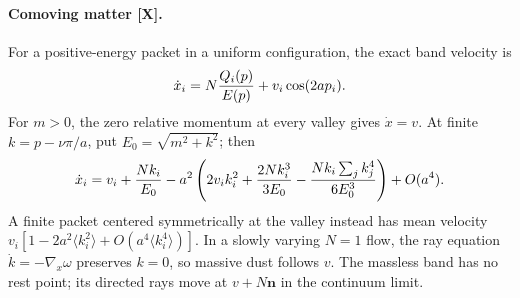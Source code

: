 
\paragraph{Comoving matter [X].}
For a positive-energy packet in a uniform configuration, the exact band
velocity is
\[
 \dot x_i=N{Q_i(p)\over E(p)}+v_i\cos(2ap_i).
\]
For $m>0$, the zero relative momentum at every valley gives $\dot x=v$.
At finite $k=p-\nu\pi/a$, put $E_0=\sqrt{m^2+k^2}$; then
\[
 \dot x_i=v_i+{Nk_i\over E_0}
 -a^2\left(2v_i k_i^2+{2Nk_i^3\over3E_0}
       -{Nk_i\sum_jk_j^4\over6E_0^3}\right)+O(a^4).
\]
A finite packet centered symmetrically at the valley instead has mean
velocity $v_i[1-2a^2\langle k_i^2\rangle+O(a^4\langle k_i^4\rangle)]$.
In a slowly varying $N=1$ flow, the ray equation
$\dot k=-\nabla_x\omega$ preserves $k=0$, so massive dust follows $v$.
The massless band has no rest point; its directed rays move at $v+N\boldsymbol n$
in the continuum limit.

